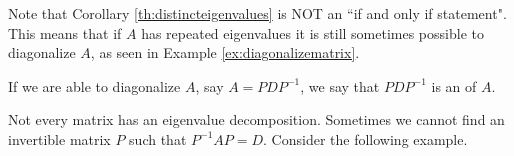 \documentclass{ximera}
\begin{document}
\begin{remark}
    Note that Corollary \ref{th:distincteigenvalues} is NOT an ``if and only if statement".  This means that if $A$ has repeated eigenvalues it is still sometimes possible to diagonalize $A$, as seen in Example \ref{ex:diagonalizematrix}.
\end{remark}

\begin{definition}\label{def:eigdecomposition}
If we are able to diagonalize $A$, say $A=PDP^{-1}$, we say that $PDP^{-1}$ is an  of $A$.
\end{definition}
Not every matrix has an eigenvalue decomposition. Sometimes we cannot find an invertible matrix $P$ such that $P^{-1}AP=D$.  Consider the following example.
\end{document}
